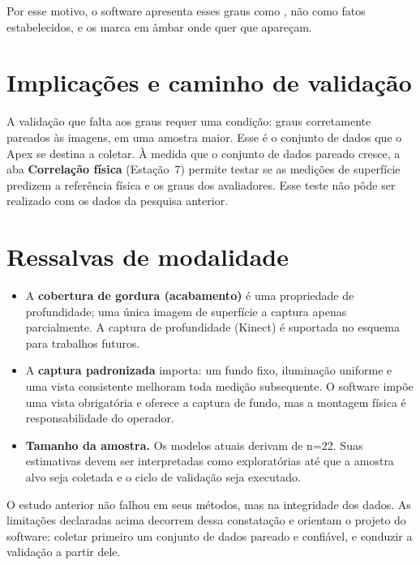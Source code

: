 Por esse motivo, o software apresenta esses graus como , não
como fatos estabelecidos, e os marca em âmbar onde quer que apareçam.

\section{Implicações e caminho de validação}

A validação que falta aos graus requer uma condição: graus corretamente
pareados às imagens, em uma amostra maior. Esse é o conjunto de dados que o Apex
se destina a coletar. À medida que o conjunto de dados pareado cresce, a aba
\textbf{Correlação física} (Estação~7) permite testar se as medições de superfície
predizem a referência física e os graus dos avaliadores. Esse teste não pôde ser
realizado com os dados da pesquisa anterior.

\section{Ressalvas de modalidade}

\begin{itemize}[leftmargin=1.3em,itemsep=3pt]
  \item A \textbf{cobertura de gordura (acabamento)} é uma propriedade de
        profundidade; uma única imagem de superfície a captura apenas
        parcialmente. A captura de profundidade (Kinect) é suportada no esquema
        para trabalhos futuros.
  \item A \textbf{captura padronizada} importa: um fundo fixo, iluminação uniforme
        e uma vista consistente melhoram toda medição subsequente. O software
        impõe uma vista obrigatória e oferece a captura de fundo, mas a montagem
        física é responsabilidade do operador.
  \item \textbf{Tamanho da amostra.} Os modelos atuais derivam de n=22. Suas
        estimativas devem ser interpretadas como exploratórias até que a amostra alvo seja
        coletada e o ciclo de validação seja executado.
\end{itemize}

\begin{note}[title=Observação de conjunto]
O estudo anterior não falhou em seus métodos, mas na integridade dos dados. As
limitações declaradas acima decorrem dessa constatação e orientam o projeto do
software: coletar primeiro um conjunto de dados pareado e confiável, e conduzir a
validação a partir dele.
\end{note}

